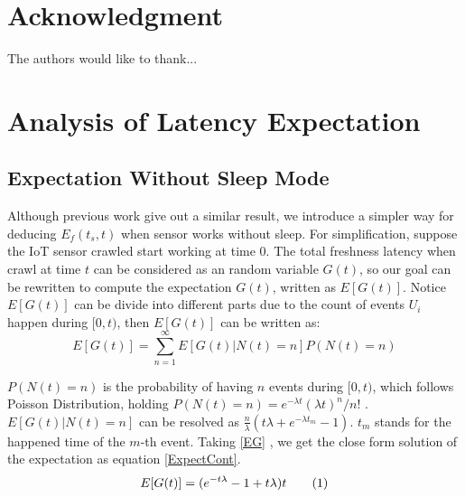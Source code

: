 \documentclass[conference]{IEEEtran}
\newcommand\numberthis{\addtocounter{equation}{1}\tag{\theequation}}
\begin{document}
\section*{Acknowledgment}


The authors would like to thank...


\ifCLASSOPTIONcaptionsoff
  \newpage
\fi





\appendices
\section{Analysis of Latency Expectation}

\subsection{Expectation Without Sleep Mode}
Although previous work\cite{Cho2000} give out a similar result, we introduce a simpler way for deducing $E_f(t_s, t)$ when sensor works without sleep. For simplification, suppose the IoT sensor crawled start working at time $0$. The total freshness latency when crawl at time $t$ can be considered as an random variable $G(t)$, so our goal can be rewritten to compute the expectation $G(t)$, written as $E[G(t)]$. 
Notice $E[G(t)]$ can be divide into different parts due to the count of events $U_i$ happen during $[0, t)$, then $E[G(t)]$ can be written as:
\begin{equation}
E[G(t)] = \sum_{n=1}^{\infty} E[G(t)|N(t)=n]P(N(t)=n) \label{EG}
\end{equation}

$P(N(t)=n)$ is the probability of having $n$ events during $[0,t)$, which follows Poisson Distribution, holding $P(N(t)=n)=e^{-\lambda t}{(\lambda t)^n}/{n!}$ . $E[G(t)|N(t)=n]$ can be resolved as $\frac{n}{\lambda}(t\lambda+e^{-\lambda t_m}-1)$. $t_{m}$ stands for the happened time of the $m$-th event. Taking \eqref{EG} , we get the close form solution of the expectation as equation \eqref{ExpectCont}.
\begin{equation}
E[G(t)] = (e^{-t\lambda}-1+t \lambda)t \numberthis \label{ExpectCont}
\end{equation}
\end{document}
